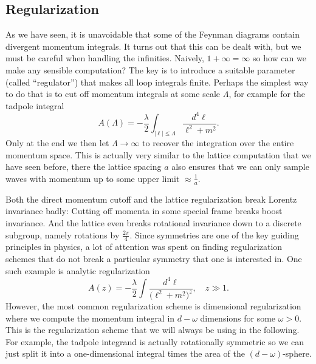 \subsection{Regularization}

As we have seen, it is unavoidable that some of the Feynman diagrams
contain divergent momentum integrals. It turns out that this can be
dealt with, but we must be careful when handling the
infinities. Naively, $1+\infty = \infty$ so how can we make any
sensible computation? The key is to introduce a suitable parameter
(called ``regulator'') that makes all loop integrals finite. Perhaps
the simplest way to do that is to cut off momentum integrals at some
scale $\Lambda$, for example for the tadpole integral
\begin{equation}
  A(\Lambda) = - \frac{\lambda}{2} \int_{|\ell| \leq \Lambda}
  \frac{d^4 \ell}{\ell^2+m^2}.
\end{equation}
Only at the end we then let $\Lambda \to \infty$ to recover the
integration over the entire momentum space. This is actually very
similar to the lattice computation that we have seen before, there the
lattice spacing $a$ also ensures that we can only sample waves with
momentum up to some upper limit $\approx \frac{1}{a}$.

Both the direct momentum cutoff and the lattice regularization break
Lorentz invariance badly: Cutting off momenta in some special frame
breaks boost invariance. And the lattice even breaks rotational
invariance down to a discrete subgroup, namely rotations by
$\tfrac{2\pi}{4}$. Since symmetries are one of the key guiding
principles in physics, a lot of attention was spent on finding
regularization schemes that do not break a particular symmetry that
one is interested in. One such example is analytic regularization
\begin{equation}
  A(z) = - \frac{\lambda}{2} \int
  \frac{d^4 \ell}{\big(\ell^2+m^2\big)^z},
  \quad
  z \gg 1.
\end{equation}
However, the most common regularization scheme is dimensional
regularization where we compute the momentum integral in $d-\omega$
dimensions for some $\omega > 0$. This is the regularization scheme
that we will always be using in the following. For example, the
tadpole integrand is actually rotationally symmetric so we can just
split it into a one-dimensional integral times the area of the
$(d-\omega)$-sphere.

